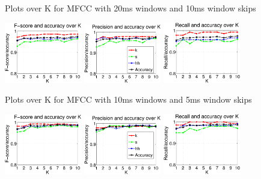 {{\begin{figure}
			\caption{Plots over K for MFCC with 20ms windows and 10ms window skips}
		\end{figure}
		\begin{figure}
			\centering\includegraphics[width=0.3\textwidth]{tex/appendices/test/mfcc105FP.png}
			\centering\includegraphics[width=0.3\textwidth]{tex/appendices/test/mfcc105_P.png}
			\centering\includegraphics[width=0.3\textwidth]{tex/appendices/test/mfcc105_R.png}
			
			\caption{Plots over K for MFCC with 10ms windows and 5ms window skips}
		\end{figure}
		\begin{figure}
			\centering\includegraphics[width=0.3\textwidth]{tex/appendices/test/mfcc52FP.png}
			\centering\includegraphics[width=0.3\textwidth]{tex/appendices/test/mfcc52_P.png}
			\centering\includegraphics[width=0.3\textwidth]{tex/appendices/test/mfcc52_R.png}
			

\end{figure}}}
